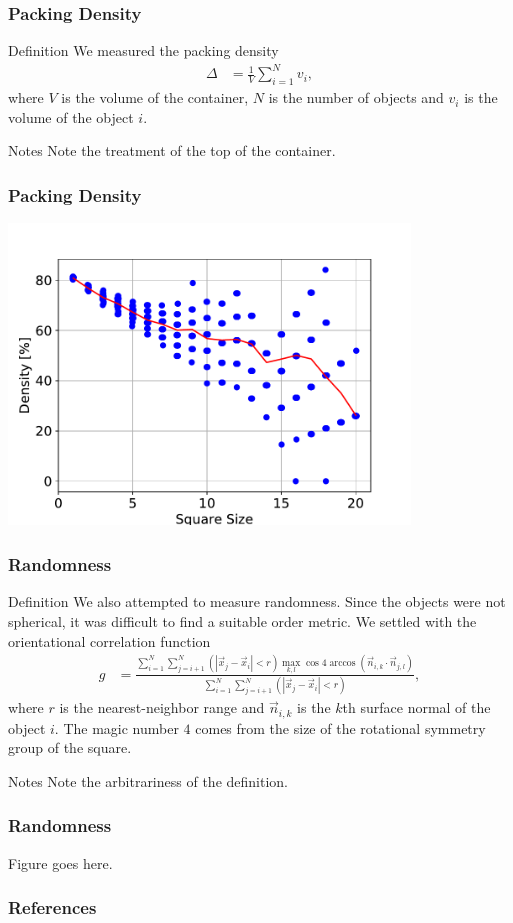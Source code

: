 \documentclass[sumlimits, intlimits]{beamer}
\begin{document}
\begin{frame}
\frametitle{Packing Density}
\begin{block}{Definition}
We measured the packing density
\begin{align*}
\Delta & = \frac 1 V \sum_{i = 1}^N v_i,
\end{align*}
where $V$ is the volume of the container,
$N$ is the number of objects and
$v_i$ is the volume of the object $i$.
\end{block}
\begin{block}{Notes}
Note the treatment of the top of the container.
\end{block}
\end{frame}

\begin{frame}
\frametitle{Packing Density}
\centering
\def \h{8cm}
\includegraphics[height=\h]{box2d}
\end{frame}

\begin{frame}
\frametitle{Randomness}
\begin{block}{Definition}
We also attempted to measure randomness.
Since the objects were not spherical,
it was difficult to find a suitable order metric.
We settled with the orientational correlation function
\begin{align*}
g & = \frac{\sum_{i = 1}^N \sum_{j = i + 1}^N (|\vec x_j - \vec x_i| < r) \max_{k, l} \cos 4 \arccos (\vec n_{i, k} \cdot \vec n_{j, l})}
{\sum_{i = 1}^N \sum_{j = i + 1}^N (|\vec x_j - \vec x_i| < r)},
\end{align*}
where $r$ is the nearest-neighbor range and
$\vec n_{i, k}$ is the $k$th surface normal of the object $i$.
The magic number $4$ comes from the size of the rotational symmetry group of the square.
\end{block}
\begin{block}{Notes}
Note the arbitrariness of the definition.
\end{block}
\end{frame}

\begin{frame}
\frametitle{Randomness}
\centering
\def \h{8cm}
Figure goes here. %
\end{frame}

\begin{frame}[allowframebreaks]
\frametitle{References}
\printbibliography
\end{frame}
\end{document}
